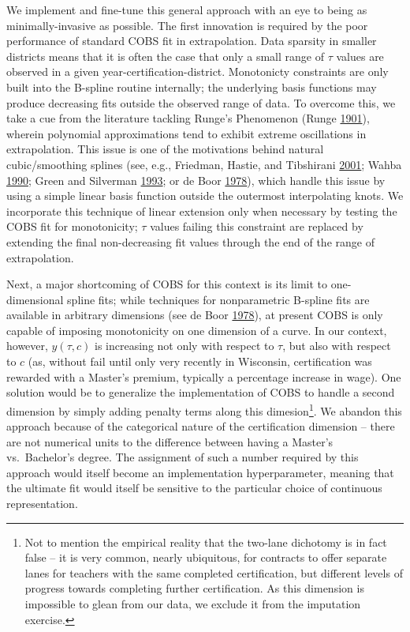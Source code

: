 \documentclass[12pt,]{article}
\let\rmarkdownfootnote\footnote%
\def\footnote{\protect\rmarkdownfootnote}
\begin{document}
We implement and fine-tune this general approach with an eye to being as
minimally-invasive as possible. The first innovation is required by the
poor performance of standard COBS fit in extrapolation. Data sparsity in
smaller districts means that it is often the case that only a small
range of \(\tau\) values are observed in a given
year-certification-district. Monotonicty constraints are only built into
the B-spline routine internally; the underlying basis functions may
produce decreasing fits outside the observed range of data. To overcome
this, we take a cue from the literature tackling Runge's Phenomenon
(Runge \protect\hyperlink{ref-runge}{1901}), wherein polynomial
approximations tend to exhibit extreme oscillations in extrapolation.
This issue is one of the motivations behind natural cubic/smoothing
splines (see, e.g., Friedman, Hastie, and Tibshirani
\protect\hyperlink{ref-friedman}{2001}; Wahba
\protect\hyperlink{ref-wahba}{1990}; Green and Silverman
\protect\hyperlink{ref-green}{1993}; or de Boor
\protect\hyperlink{ref-deboor}{1978}), which handle this issue by using
a simple linear basis function outside the outermost interpolating
knots. We incorporate this technique of linear extension only when
necessary by testing the COBS fit for monotonicity; \(\tau\) values
failing this constraint are replaced by extending the final
non-decreasing fit values through the end of the range of extrapolation.

Next, a major shortcoming of COBS for this context is its limit to
one-dimensional spline fits; while techniques for nonparametric B-spline
fits are available in arbitrary dimensions (see de Boor
\protect\hyperlink{ref-deboor}{1978}), at present COBS is only capable
of imposing monotonicity on one dimension of a curve. In our context,
however, \(y(\tau, c)\) is increasing not only with respect to \(\tau\),
but also with respect to \(c\) (as, without fail until only very
recently in Wisconsin, certification was rewarded with a Master's
premium, typically a percentage increase in wage). One solution would be
to generalize the implementation of COBS to handle a second dimension by
simply adding penalty terms along this dimesion\footnote{Not to mention
  the empirical reality that the two-lane dichotomy is in fact false --
  it is very common, nearly ubiquitous, for contracts to offer separate
  lanes for teachers with the same completed certification, but
  different levels of progress towards completing further certification.
  As this dimension is impossible to glean from our data, we exclude it
  from the imputation exercise.}. We abandon this approach because of
the categorical nature of the certification dimension -- there are not
numerical units to the difference between having a Master's
vs.~Bachelor's degree. The assignment of such a number required by this
approach would itself become an implementation hyperparameter, meaning
that the ultimate fit would itself be sensitive to the particular choice
of continuous representation.
\end{document}
